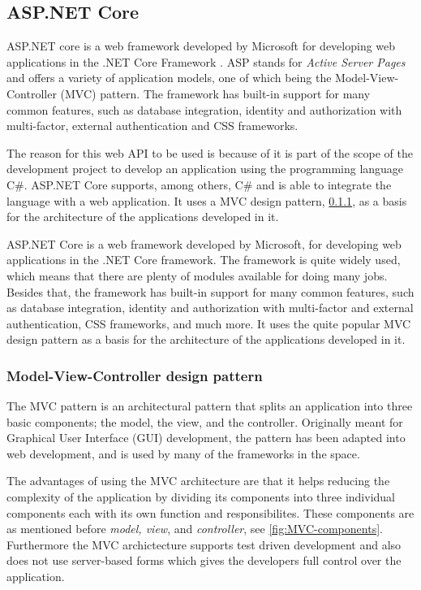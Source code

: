 \documentclass[../../master.tex]{subfiles}
\begin{document}
\subsection{ASP.NET Core} \label{sec:aspnetcore}

ASP.NET core is a web framework developed by Microsoft for developing web applications in the .NET Core Framework \cite{aspnetcore2}.
ASP stands for \textit{Active Server Pages} and offers a variety of application models, one of which being the Model-View-Controller (MVC) pattern.
The framework has built-in support for many common features, such as database integration, identity and authorization with multi-factor, external authentication and CSS frameworks.

The reason for this web API to be used is because of it is part of the scope of the development project to develop an application using the programming language C\#.
ASP.NET Core supports, among others, C\# and is able to integrate the language with a web application.
It uses a MVC design pattern, \cref{sec:mvc}, as a basis for the architecture of the applications developed in it.

ASP.NET Core is a web framework developed by Microsoft, for developing web applications in the .NET Core framework.
The framework is quite widely used, which means that there are plenty of modules available for doing many jobs. 
Besides that, the framework has built-in support for many common features, such as database integration, identity and authorization with multi-factor and external authentication, CSS frameworks, and much more.
It uses the quite popular MVC design pattern as a basis for the architecture of the applications developed in it.

\subsubsection{Model-View-Controller design pattern}\label{sec:mvc}
The MVC pattern is an architectural pattern that splits an application into three basic components; the model, the view, and the controller.
Originally meant for Graphical User Interface (GUI) development, the pattern has been adapted into web development, and is used by many of the frameworks in the space. \cite{gangoffour}

The advantages of using the MVC architecture are that it helps reducing the complexity of the application by dividing its components into three individual components each with its own function and responsibilites.
These components are as mentioned before \textit{model, view}, and \textit{controller}, see \cref{fig:MVC-components}.
Furthermore the MVC archictecture supports test driven development and also does not use server-based forms which gives the developers full control over the application. \cite{mvcarticle}
\end{document}
